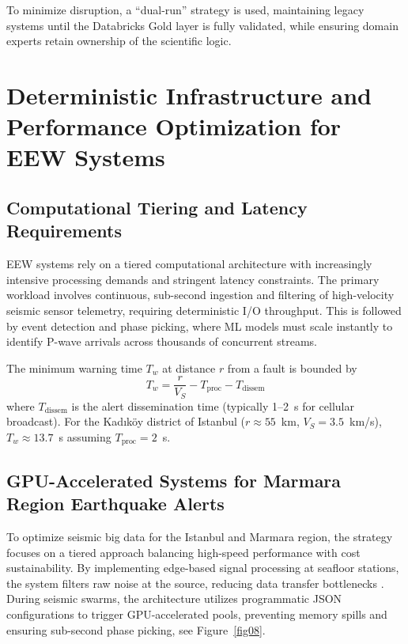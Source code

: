 \documentclass[data,article,accept,pdftex,moreauthors]{Definitions/mdpi}
\begin{document}
To minimize disruption, a ``dual-run'' strategy is used, maintaining legacy systems until the Databricks Gold layer is fully validated, while ensuring domain experts retain ownership of the scientific logic.

\section{Deterministic Infrastructure and Performance Optimization for \linebreak EEW Systems}

\subsection{Computational Tiering and Latency Requirements}

EEW systems rely on a tiered computational architecture with increasingly intensive processing demands and stringent latency constraints. The primary workload involves continuous, sub-second ingestion and filtering of high-velocity seismic sensor telemetry, requiring deterministic I/O throughput. This is followed by event detection and phase picking, where ML models must scale instantly to identify P-wave arrivals across thousands of concurrent streams.

The minimum warning time $T_w$ at distance $r$ from a fault is bounded by
\begin{equation}
T_w = \frac{r}{V_S} - T_{\text{proc}} - T_{\text{dissem}}
\end{equation}
where $T_{\text{dissem}}$ is the alert dissemination time (typically 1--2~s for cellular broadcast). For the Kadıköy district of Istanbul ($r \approx 55$~km, $V_S = 3.5$~km/s), $T_w \approx 13.7$~s assuming $T_{\text{proc}} = 2$~s.

\subsection{GPU-Accelerated Systems for Marmara Region Earthquake Alerts}

To optimize seismic big data for the Istanbul and Marmara region, the strategy focuses on a tiered approach balancing high-speed performance with cost sustainability. By implementing edge-based signal processing at seafloor stations, the system filters raw noise at the source, reducing data transfer bottlenecks \cite{Bacon2025}. During seismic swarms, the architecture utilizes programmatic JSON configurations to trigger GPU-accelerated pools, preventing memory spills and ensuring sub-second phase picking, see Figure~\ref{fig08}.
\end{document}
